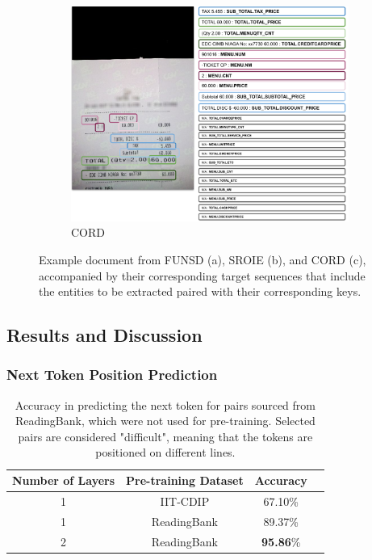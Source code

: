 \begin{figure}
  \begin{subfigure}[b]{0.6\textwidth}
    \includegraphics[width=\textwidth]{images/chapter4/cord_sample_and_output.pdf}
    \caption{CORD}
  \end{subfigure}
  \caption{Example document from FUNSD (a), SROIE (b), and CORD (c), accompanied by their corresponding target sequences that include the entities to be extracted paired with their corresponding keys.}
    \label{fig:source-target-sample}
\end{figure}

\subsection{Results and Discussion}

\subsubsection{Next Token Position Prediction}

\begin{table}
  \centering
  \small
  \begin{adjustbox}{max width=\textwidth}
  \begin{threeparttable}
  \begin{tabular}{cccc}
      \toprule
          Number of Layers & Pre-training Dataset & Accuracy \\ 
      \midrule
          1                & IIT-CDIP             & 67.10\%  \\
          1                & ReadingBank          & 89.37\%  \\
          2                & ReadingBank          & \textbf{95.86}\%   \\
      \bottomrule
  \end{tabular}
  \end{threeparttable}
  \end{adjustbox}
  \caption{Accuracy in predicting the next token for pairs sourced from ReadingBank, which were not used for pre-training. Selected pairs are considered "difficult", meaning that the tokens are positioned on different lines.}
  \label{table:next-token-prediction-results}
\end{table}

